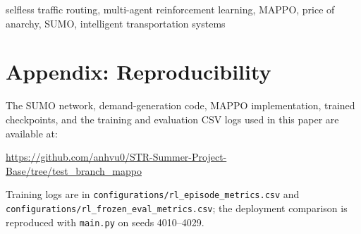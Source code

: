\documentclass[conference]{IEEEtran}
\begin{document}
\begin{IEEEkeywords}
selfless traffic routing, multi-agent reinforcement learning, MAPPO, price of anarchy, SUMO, intelligent transportation systems
\end{IEEEkeywords}

\IEEEpeerreviewmaketitle










\section*{Appendix: Reproducibility}
The SUMO network, demand-generation code, MAPPO implementation, trained checkpoints,
and the training and evaluation CSV logs used in this paper are available at:

\url{https://github.com/anhvu0/STR-Summer-Project-Base/tree/test_branch_mappo}

\noindent Training logs are in \texttt{configurations/rl\_episode\_metrics.csv} and
\texttt{configurations/rl\_frozen\_eval\_metrics.csv}; the deployment comparison is
reproduced with \texttt{main.py} on seeds 4010--4029.
\end{document}
